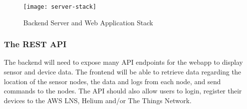 \begin{figure}
  \centering
  \texttt{[image: server-stack]}
  \caption{Backend Server and Web Application Stack}
  \label{server-stack}
\end{figure}


\subsubsection{The REST API}
The backend will need to expose many API endpoints for the webapp to display sensor and device data.
The frontend will be able to retrieve data regarding the location of the sensor nodes, the data and
logs from each node, and send commands to the nodes. The API should also allow users to login,
register their devices to the AWS LNS, Helium and/or The Things Network.

